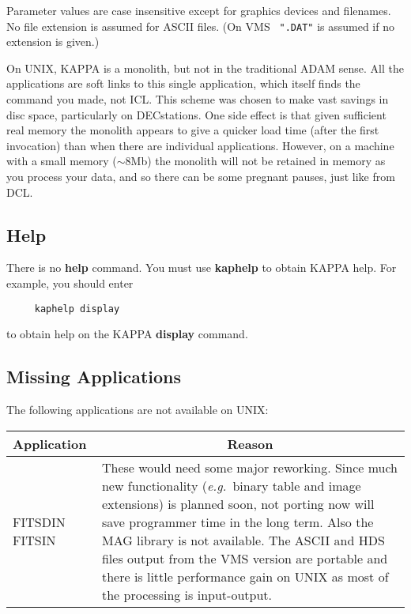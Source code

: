 {Parameter values are case insensitive except for graphics devices and
filenames.  No file extension is assumed for ASCII files. (On VMS {\tt
".DAT"} is assumed if no extension is given.) 

On UNIX, {\sc KAPPA} is a monolith, but not in the traditional
{\sc ADAM} sense. All the applications are soft links to this single
application, which itself finds the command you made, not {\sc ICL}.  This
scheme was chosen to make vast savings in disc space, particularly on
DECstations. One side effect is that given sufficient real memory the
monolith appears to give a quicker load time (after the first
invocation) than when there are individual applications. However, on a
machine with a small memory ($\sim$8Mb) the monolith will not be
retained in memory as you process your data, and so there can be some
pregnant pauses, just like from {\sc DCL}. 

\subsection{Help}

There is no {\bf help} command.  You must use {\bf kaphelp} to
obtain {\sc KAPPA} help.  For example, you should enter 

\begin{verbatim}
     kaphelp display
\end{verbatim}

to obtain help on the {\sc KAPPA} {\bf display} command.

\subsection{Missing Applications}

The following applications are not available on UNIX:

\begin{center}
\begin{tabular}{|p{18mm}|p{130mm}|}
\hline
Application & \multicolumn{1}{c|}{Reason} \\ \hline
FITSDIN  FITSIN &  These would need some major reworking.  Since
 much new functionality ({\it e.g.}\ binary table and image  extensions)
 is planned soon, not porting now will save programmer time in the long
 term.  Also the MAG library is not available.  The ASCII and HDS files
 output from the VMS version are portable and there is little performance
 gain on UNIX as most of the processing is input-output. \\ \hline


\end{tabular}
\end{center}}
